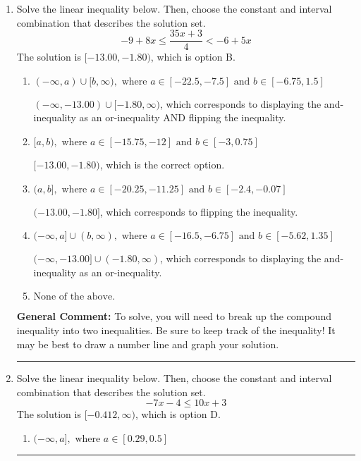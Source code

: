 \documentclass{extbook}[14pt]
\newcommand{\litem}[1]{\item #1

\rule{\textwidth}{0.4pt}}
\begin{document}
\begin{enumerate}
{\begin{enumerate}[label=\Alph*.]
This describes the values more than 8 from 3
\item \( (-5, 11) \)

This describes the values less than 8 from 3
\item \( \text{None of the above} \)

Options A-D described the values [more/less than] 8 units from 3, which is the reverse of what the question asked.
\end{enumerate}

\textbf{General Comment:} When thinking about this language, it helps to draw a number line and try points.
}
\litem{
Solve the linear inequality below. Then, choose the constant and interval combination that describes the solution set.
\[ -9 + 8 x \leq \frac{35 x + 3}{4} < -6 + 5 x \]The solution is \( [-13.00, -1.80) \), which is option B.\begin{enumerate}[label=\Alph*.]
\item \( (-\infty, a) \cup [b, \infty), \text{ where } a \in [-22.5, -7.5] \text{ and } b \in [-6.75, 1.5] \)

$(-\infty, -13.00) \cup [-1.80, \infty)$, which corresponds to displaying the and-inequality as an or-inequality AND flipping the inequality.
\item \( [a, b), \text{ where } a \in [-15.75, -12] \text{ and } b \in [-3, 0.75] \)

$[-13.00, -1.80)$, which is the correct option.
\item \( (a, b], \text{ where } a \in [-20.25, -11.25] \text{ and } b \in [-2.4, -0.07] \)

$(-13.00, -1.80]$, which corresponds to flipping the inequality.
\item \( (-\infty, a] \cup (b, \infty), \text{ where } a \in [-16.5, -6.75] \text{ and } b \in [-5.62, 1.35] \)

$(-\infty, -13.00] \cup (-1.80, \infty)$, which corresponds to displaying the and-inequality as an or-inequality.
\item \( \text{None of the above.} \)


\end{enumerate}

\textbf{General Comment:} To solve, you will need to break up the compound inequality into two inequalities. Be sure to keep track of the inequality! It may be best to draw a number line and graph your solution.
}
\litem{
Solve the linear inequality below. Then, choose the constant and interval combination that describes the solution set.
\[ -7x -4 \leq 10x + 3 \]The solution is \( [-0.412, \infty) \), which is option D.\begin{enumerate}[label=\Alph*.]
\item \( (-\infty, a], \text{ where } a \in [0.29, 0.5] \)


\end{enumerate}}
\end{enumerate}
\end{document}
